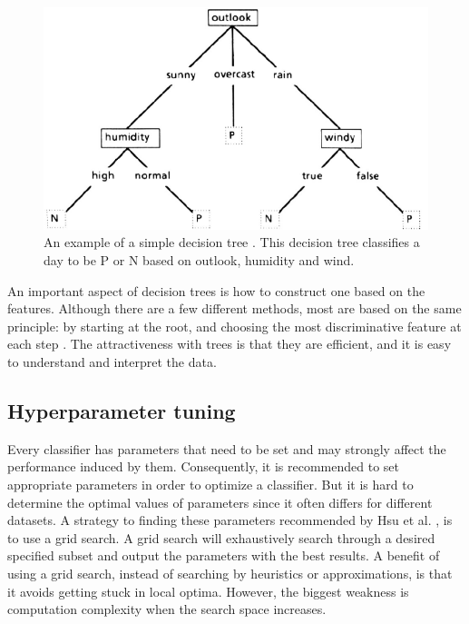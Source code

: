 \documentclass[USenglish]{ifimaster}  %
\begin{document}
	
\begin{figure}[h]
		\centering
		\includegraphics[scale=0.5]{Figures/decisionTree.PNG}
		\caption[An example of decision tree classification]{An example of a simple decision tree \cite{Quinlan1986}. This decision tree classifies a day to be P or N based on outlook, humidity and wind.}
		\label{fig:decisiontree}
\end{figure}
\FloatBarrier

An important aspect of decision trees is how to construct one based on the features. Although there are a few different methods, most are based on the same principle: by starting at the root, and choosing the most discriminative feature at each step \cite{Marsland:2009:MLA:1571643}. The attractiveness with trees is that they are efficient, and it is easy to understand and interpret the data.

\subsection{Hyperparameter tuning}\label{sub:hypt}
Every classifier has parameters that need to be set and may strongly affect the performance induced by them. Consequently, it is recommended to set appropriate parameters in order to optimize a classifier. But it is hard to determine the optimal values of parameters since it often differs for different datasets. A strategy to finding these parameters recommended by Hsu et al. \cite{Hsu10apractical}, is to use a grid search. A grid search will exhaustively search through a desired specified subset and output the parameters with the best results. A benefit of using a grid search, instead of searching by heuristics or approximations, is that it avoids getting stuck in local optima. However, the biggest weakness is computation complexity when the search space increases.
\end{document}
